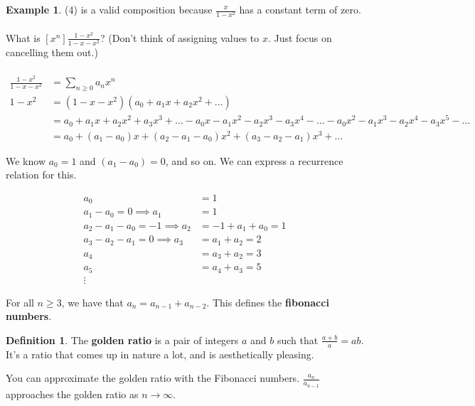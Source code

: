 \documentclass[]{article}
\theoremstyle{definition}
\newtheorem*{defn}{Definition}
\newtheorem{ex}{Example}[section]
\begin{document}
\begin{ex}
					(4) is a valid composition because $\frac{x}{1 - x^2}$ has a constant term of zero.
					\\ \\
					What is $[x^n] \frac{1 - x^2}{1 - x - x^2}$? (Don't think of assigning values to $x$. Just focus on cancelling them out.)
					\\ \\
					\begin{align*}
						\frac{1 - x^2}{1 - x - x^2} &= \sum_{n \ge 0} a_n x^n \\
						1 - x^2 &= (1 - x - x^2)(a_0 + a_1x + a_2x^2 + \ldots) \\
						&= a_0 + a_1x + a_2x^2 + a_3x^3 + \ldots - a_0x -a_1x^2 - a_2x^3 - a_3x^4 - \ldots -a_0x^2 - a_1x^3 - a_2x^4 - a_3x^5 - \ldots \\
						&= a_0 + (a_1 - a_0)x + (a_2 - a_1 - a_0)x^2 + (a_3 - a_2 - a_1)x^3 + \ldots
					\end{align*}

					We know $a_0 = 1$ and $(a_1 - a_0) = 0$, and so on. We can express a recurrence relation for this.
					
					\begin{align*}
						a_0 &= 1 \\
						a_1 - a_0 = 0 \implies a_1 &= 1 \\
						a_2 - a_1 - a_0 = -1 \implies a_2 &= -1 + a_1 + a_0 = 1 \\
						a_3 - a_2 - a_1 = 0 \implies a_3 &= a_1 + a_2 = 2 \\
						a_4 &= a_3 + a_2 = 3 \\
						a_5 &= a_4 + a_3 = 5 \\
						\vdots&
					\end{align*}

					For all $n \ge 3$, we have that $a_n = a_{n - 1} + a_{n - 2}$. This defines the \textbf{fibonacci numbers}.
				\end{ex}
				
				\begin{defn}
					The \textbf{golden ratio} is a pair of integers $a$ and $b$ such that $\frac{a + b}{a} = {a}{b}$. It's a ratio that comes up in nature a lot, and is aesthetically pleasing.
				\end{defn}

				You can approximate the golden ratio with the Fibonacci numbers. $\frac{a_n}{a_{n - 1}}$ approaches the golden ratio as $n \to \infty$.
				
\end{document}
